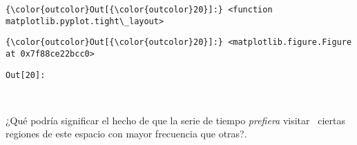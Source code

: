 \documentclass[11pt]{article}
\begin{document}
\begin{Verbatim}[commandchars=\\\{\}]
{\color{outcolor}Out[{\color{outcolor}20}]:} <function matplotlib.pyplot.tight\_layout>
\end{Verbatim}
            
\begin{Verbatim}[commandchars=\\\{\}]
{\color{outcolor}Out[{\color{outcolor}20}]:} <matplotlib.figure.Figure at 0x7f88ce22bcc0>
\end{Verbatim}
            \texttt{\color{outcolor}Out[{\color{outcolor}20}]:}
    
    \begin{center}
    \end{center}
    { \hspace*{\fill} \\}
    

    ¿Qué podría significar el hecho de que la serie de tiempo
\emph{prefiera} visitar ~ciertas regiones de este espacio con mayor
frecuencia que otras?.


    
    
    
    
\end{document}
